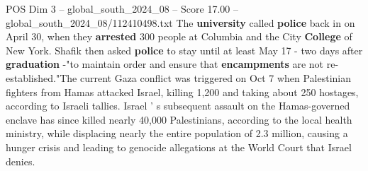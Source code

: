 \begin{textsample}{POS Dim 3 – global\_south\_2024\_08 – Score 17.00 – global\_south\_2024\_08/112410498.txt}
The \textbf{university} called \textbf{police} back in on April 30, when they \textbf{arrested} 300 people at Columbia and the City \textbf{College} of New York.
Shafik then asked \textbf{police} to stay until at least May 17 - two days after \textbf{graduation} -"to maintain order and ensure that \textbf{encampments} are not re-established."The current Gaza conflict was triggered on Oct 7 when Palestinian fighters from Hamas attacked Israel, killing 1,200 and taking about 250 hostages, according to Israeli tallies.
Israel ' s subsequent assault on the Hamas-governed enclave has since killed nearly 40,000 Palestinians, according to the local health ministry, while displacing nearly the entire population of 2.3 million, causing a hunger crisis and leading to genocide allegations at the World Court that Israel denies.

\end{textsample}
